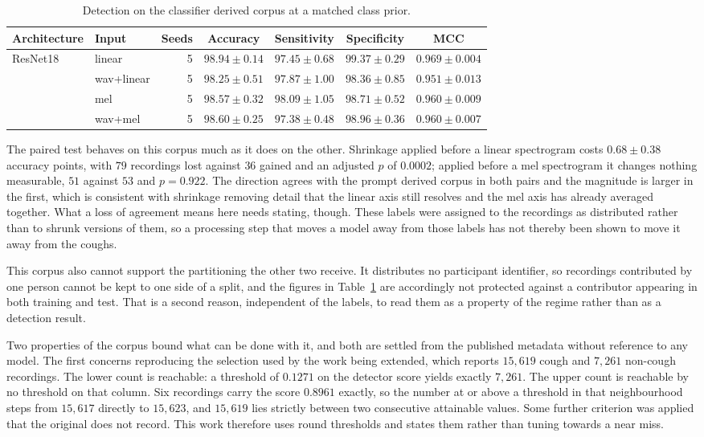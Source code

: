 \documentclass{ieeeaccess}
\begin{document}
\begin{table}[tbp]
\caption{Detection on the classifier derived corpus at a matched class prior.}\label{tab:regime}
\small
\begin{tabular}{@{}llrcccc@{}}
\toprule
Architecture & Input & Seeds & Accuracy & Sensitivity & Specificity & MCC \\
\midrule
ResNet18 & linear & 5 & $98.94 \pm 0.14$ & $97.45 \pm 0.68$ & $99.37 \pm 0.29$ & $0.969 \pm 0.004$ \\
 & wav+linear & 5 & $98.25 \pm 0.51$ & $97.87 \pm 1.00$ & $98.36 \pm 0.85$ & $0.951 \pm 0.013$ \\
 & mel & 5 & $98.57 \pm 0.32$ & $98.09 \pm 1.05$ & $98.71 \pm 0.52$ & $0.960 \pm 0.009$ \\
 & wav+mel & 5 & $98.60 \pm 0.25$ & $97.38 \pm 0.48$ & $98.96 \pm 0.36$ & $0.960 \pm 0.007$ \\
\bottomrule
\end{tabular}
\end{table}

The paired test behaves on this corpus much as it does on the other. Shrinkage applied
before a linear spectrogram costs $0.68 \pm 0.38$ accuracy points, with $79$ recordings
lost against $36$ gained and an adjusted $p$ of $0.0002$; applied before a mel spectrogram
it changes nothing measurable, $51$ against $53$ and $p = 0.922$. The direction agrees
with the prompt derived corpus in both pairs and the magnitude is larger in the first,
which is consistent with shrinkage removing detail that the linear axis still resolves and
the mel axis has already averaged together. What a loss of agreement means here needs
stating, though. These labels were assigned to the recordings as distributed rather than to
shrunk versions of them, so a processing step that moves a model away from those labels has
not thereby been shown to move it away from the coughs.

This corpus also cannot support the partitioning the other two receive. It distributes no
participant identifier, so recordings contributed by one person cannot be kept to one side
of a split, and the figures in Table~\ref{tab:regime} are accordingly not protected against
a contributor appearing in both training and test. That is a second reason, independent of
the labels, to read them as a property of the regime rather than as a detection result.

Two properties of the corpus bound what can be done with it, and both are settled from the
published metadata without reference to any model. The first concerns reproducing the
selection used by the work being extended, which reports $15{,}619$ cough and $7{,}261$
non-cough recordings. The lower count is reachable: a threshold of $0.1271$ on the detector
score yields exactly $7{,}261$. The upper count is reachable by no threshold on that
column. Six recordings carry the score $0.8961$ exactly, so the number at or above a
threshold in that neighbourhood steps from $15{,}617$ directly to $15{,}623$, and
$15{,}619$ lies strictly between two consecutive attainable values. Some further criterion
was applied that the original does not record. This work therefore uses round thresholds
and states them rather than tuning towards a near miss.
\end{document}
